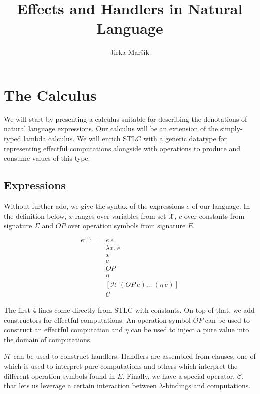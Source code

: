 \documentclass{article}
\title{Effects and Handlers in Natural Language}
\author{Jirka Maršík}
\begin{document}
\maketitle



\section{The Calculus}

We will start by presenting a calculus suitable for describing the
denotations of natural language expressions. Our calculus will be an
extension of the simply-typed lambda calculus. We will enrich STLC with a
generic datatype for representing effectful computations alongside with
operations to produce and consume values of this type.


\subsection{Expressions}

Without further ado, we give the syntax of the expressions $e$ of our
language. In the definition below, $x$ ranges over variables from set
$\mathcal{X}$, $c$ over constants from signature $\Sigma$ and $OP$ over
operation symbols from signature $E$.

\begin{align*}
  e ::= \
  & e\ e \\
  & \lambda x.\ e \\
  & x \\
  & c \\
  & OP \\
  & \eta \\
  & \left[\mathcal{H}\ (OP\ e) \ldots\ (\eta\ e)\right]\\
  & \mathcal{C}
\end{align*}

The first 4 lines come directly from STLC with constants. On top of that,
we add constructors for effectful computations. An operation symbol $OP$
can be used to construct an effectful computation and $\eta$ can be used to
inject a pure value into the domain of computations.

$\mathcal{H}$ can be used to construct handlers. Handlers are assembled
from clauses, one of which is used to interpret pure computations and
others which interpret the different operation symbols found in
$E$. Finally, we have a special operator, $\mathcal{C}$, that lets us
leverage a certain interaction between $\lambda$-bindings and computations.
\end{document}

